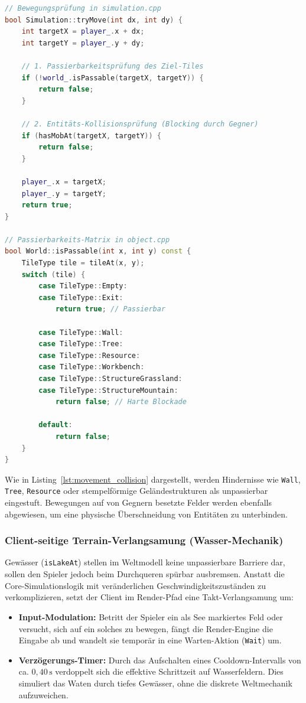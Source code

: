 \documentclass[
  a4paper,
  11pt,
  twoside,
  BCOR=8mm,           %
  headings=big,
  numbers=noenddot,
  listof=totoc,       %
  captions=tableheading,
]{scrreprt}
\begin{document}
\begin{lstlisting}[language=C++, caption={Diskrete Bewegungs- und Kollisionsprüfung in \texttt{simulation.cpp} und \texttt{object.cpp}}, label={lst:movement_collision}]
// Bewegungsprüfung in simulation.cpp
bool Simulation::tryMove(int dx, int dy) {
    int targetX = player_.x + dx;
    int targetY = player_.y + dy;

    // 1. Passierbarkeitsprüfung des Ziel-Tiles
    if (!world_.isPassable(targetX, targetY)) {
        return false;
    }

    // 2. Entitäts-Kollisionsprüfung (Blocking durch Gegner)
    if (hasMobAt(targetX, targetY)) {
        return false;
    }

    player_.x = targetX;
    player_.y = targetY;
    return true;
}

// Passierbarkeits-Matrix in object.cpp
bool World::isPassable(int x, int y) const {
    TileType tile = tileAt(x, y);
    switch (tile) {
        case TileType::Empty:
        case TileType::Exit:
            return true; // Passierbar
            
        case TileType::Wall:
        case TileType::Tree:
        case TileType::Resource:
        case TileType::Workbench:
        case TileType::StructureGrassland:
        case TileType::StructureMountain:
            return false; // Harte Blockade
            
        default:
            return false;
    }
}
\end{lstlisting}

Wie in Listing~\ref{lst:movement_collision} dargestellt, werden Hindernisse wie \texttt{Wall}, \texttt{Tree}, \texttt{Resource} oder stempelförmige Geländestrukturen als unpassierbar eingestuft. Bewegungen auf von Gegnern besetzte Felder werden ebenfalls abgewiesen, um eine physische Überschneidung von Entitäten zu unterbinden.

\subsubsection{Client-seitige Terrain-Verlangsamung (Wasser-Mechanik)}
Gewässer (\texttt{isLakeAt}) stellen im Weltmodell keine unpassierbare Barriere dar, sollen den Spieler jedoch beim Durchqueren spürbar ausbremsen. Anstatt die Core-Simulationslogik mit veränderlichen Geschwindigkeitszuständen zu verkomplizieren, setzt der Client im Render-Pfad eine Takt-Verlangsamung um:

\begin{itemize}
    \item \textbf{Input-Modulation:} Betritt der Spieler ein als See markiertes Feld oder versucht, sich auf ein solches zu bewegen, fängt die Render-Engine die Eingabe ab und wandelt sie temporär in eine Warten-Aktion (\texttt{Wait}) um.
    \item \textbf{Verzögerungs-Timer:} Durch das Aufschalten eines Cooldown-Intervalls von ca. $0{,}40\,\text{s}$ verdoppelt sich die effektive Schrittzeit auf Wasserfeldern. Dies simuliert das Waten durch tiefes Gewässer, ohne die diskrete Weltmechanik aufzuweichen.
\end{itemize}
\end{document}
